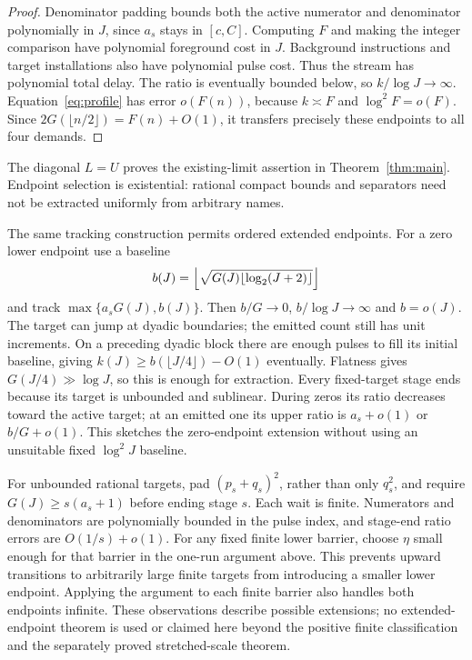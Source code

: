 \begin{proof}
Denominator padding bounds both the active numerator and denominator polynomially in $J$, since $a_s$ stays in $[c,C]$. Computing $F$ and making the integer comparison have polynomial foreground cost in $J$. Background instructions and target installations also have polynomial pulse cost. Thus the stream has polynomial total delay. The ratio is eventually bounded below, so $k/\log J\to\infty$. Equation~\eqref{eq:profile} has error $o(F(n))$, because $k\asymp F$ and $\log^2 F=o(F)$. Since $2G(\lfloor n/2\rfloor)=F(n)+O(1)$, it transfers precisely these endpoints to all four demands.
\end{proof}

The diagonal $L=U$ proves the existing-limit assertion in Theorem~\ref{thm:main}. Endpoint selection is existential: rational compact bounds and separators need not be extracted uniformly from arbitrary names.

\begin{remark}\label{rem:extended}
The same tracking construction permits ordered extended endpoints. For a zero lower endpoint use a baseline
\[
 b(J)=\left\lfloor\sqrt{G(J)\lfloor\log_2(J+2)\rfloor}\right\rfloor
\]
and track $\max\{a_sG(J),b(J)\}$. Then $b/G\to0$, $b/\log J\to\infty$ and $b=o(J)$. The target can jump at dyadic boundaries; the emitted count still has unit increments. On a preceding dyadic block there are enough pulses to fill its initial baseline, giving $k(J)\ge b(\lfloor J/4\rfloor)-O(1)$ eventually. Flatness gives $G(J/4)\gg\log J$, so this is enough for extraction. Every fixed-target stage ends because its target is unbounded and sublinear. During zeros its ratio decreases toward the active target; at an emitted one its upper ratio is $a_s+o(1)$ or $b/G+o(1)$. This sketches the zero-endpoint extension without using an unsuitable fixed $\log^2 J$ baseline.

For unbounded rational targets, pad $(p_s+q_s)^2$, rather than only $q_s^2$, and require $G(J)\ge s(a_s+1)$ before ending stage $s$. Each wait is finite. Numerators and denominators are polynomially bounded in the pulse index, and stage-end ratio errors are $O(1/s)+o(1)$. For any fixed finite lower barrier, choose $\eta$ small enough for that barrier in the one-run argument above. This prevents upward transitions to arbitrarily large finite targets from introducing a smaller lower endpoint. Applying the argument to each finite barrier also handles both endpoints infinite. These observations describe possible extensions; no extended-endpoint theorem is used or claimed here beyond the positive finite classification and the separately proved stretched-scale theorem.
\end{remark}

